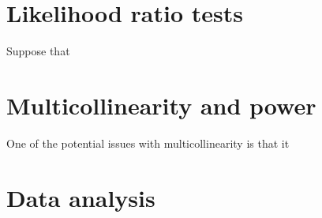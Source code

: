 \documentclass[11pt]{article}
\begin{document}
\section*{Likelihood ratio tests}

Suppose that 


\section*{Multicollinearity and power}

One of the potential issues with multicollinearity is that it 

\section*{Data analysis}
\end{document}
